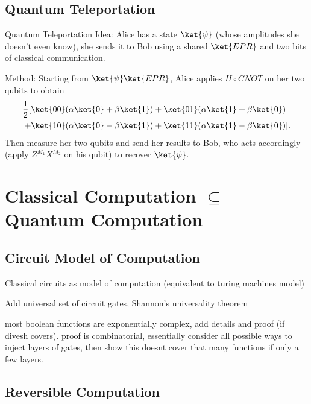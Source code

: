 \subsection{Quantum Teleportation}

Quantum Teleportation
Idea: Alice has a state $\ket{\psi}$ (whose amplitudes she doesn't even know), she sends it to Bob using a shared $\ket{EPR}$ and two bits of classical communication.

Method: Starting from $\ket{\psi}\ket{EPR}$, Alice applies $H\circ CNOT$ on her two qubits to obtain
\begin{align*}
    \frac{1}{2}[&\ket{00}(\alpha\ket{0}+\beta\ket{1}) + \ket{01}(\alpha\ket{1}+\beta\ket{0})\\
    + &\ket{10}(\alpha\ket{0}-\beta\ket{1}) + \ket{11}(\alpha\ket{1}-\beta\ket{0})].
\end{align*}
Then measure her two qubits and send her results to Bob, who acts accordingly (apply $Z^{M_1}X^{M_2}$ on his qubit) to recover $\ket{\psi}$.




\section[\texorpdfstring{Classical Computation $\bm{\subseteq}$ Quantum Computation}{}]{Classical Computation $\bm{\subseteq}$ Quantum Computation} 

\subsection{Circuit Model of Computation}

Classical circuits as model of computation (equivalent to turing machines model)

Add universal set of circuit gates, Shannon's universality theorem

most boolean functions are exponentially complex, add details and proof (if divesh covers). proof is combinatorial, essentially consider all possible ways to inject layers of gates, then show this doesnt cover that many functions if only a few layers.


\subsection{Reversible Computation}

